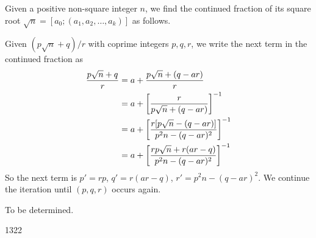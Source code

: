 




\solution

Given a positive non-square integer $n$, we find the continued fraction of its square root
$\sqrt{n} = [ a_0; (a_1, a_2, \ldots, a_k)]$ as follows.

Given $(p\sqrt{n}+q)/r$ with coprime integers $p, q, r$, we write the next term in the continued fraction as
\begin{align}
\frac{p \sqrt{n}+q}{r}
&= a + \frac{p \sqrt{n}+(q-ar)}{r} \notag \\
&= a + \left[ \frac{r}{p \sqrt{n}+(q-ar)} \right]^{-1} \notag \\
&= a + \left[ \frac{r[p \sqrt{n}-(q-ar)]}{p^2 n - (q-ar)^2} \right]^{-1} \notag \\
&= a + \left[ \frac{rp \sqrt{n}+r(ar-q)}{p^2 n - (q-ar)^2} \right]^{-1} \notag
\end{align}
So the next term is $p' = rp$, $q' = r(ar-q)$, $r' = p^2 n - (q-ar)^2$. We continue the iteration until $(p,q,r)$ occurs again.

\complexity

To be determined.

\answer

1322

 